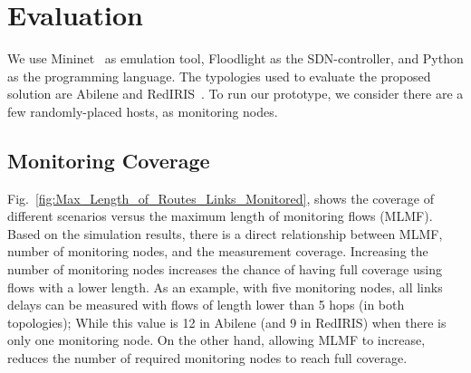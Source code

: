 \documentclass[10pt, journal, letterpaper]{IEEEtran}
\begin{document}
\section{Evaluation}\label{sec:evaluation}
We use Mininet~\cite{kaur2014mininet} as emulation tool, Floodlight as the SDN-controller, and Python as the programming language. The typologies used to evaluate the proposed solution are Abilene and RedIRIS~\cite{topologyzoo}. To run our prototype, we consider there are a few randomly-placed hosts, as monitoring nodes. %



\subsection{Monitoring Coverage}\label{subsec:eval_coverage}
Fig.~\ref{fig:Max_Length_of_Routes_Links_Monitored}, shows the coverage of different scenarios versus the maximum length of monitoring flows (MLMF). Based on the simulation results, there is a direct relationship between MLMF, number of monitoring nodes, and the measurement coverage. Increasing the number of monitoring nodes increases the chance of having full coverage using flows with a lower length. As an example, with five monitoring nodes, all links delays can be measured with flows of length lower than 5 hops (in both topologies); While this value is 12 in Abilene (and 9 in RedIRIS) when there is only one monitoring node.
On the other hand, allowing MLMF to increase, reduces the number of required monitoring nodes to reach full coverage. 
\end{document}
